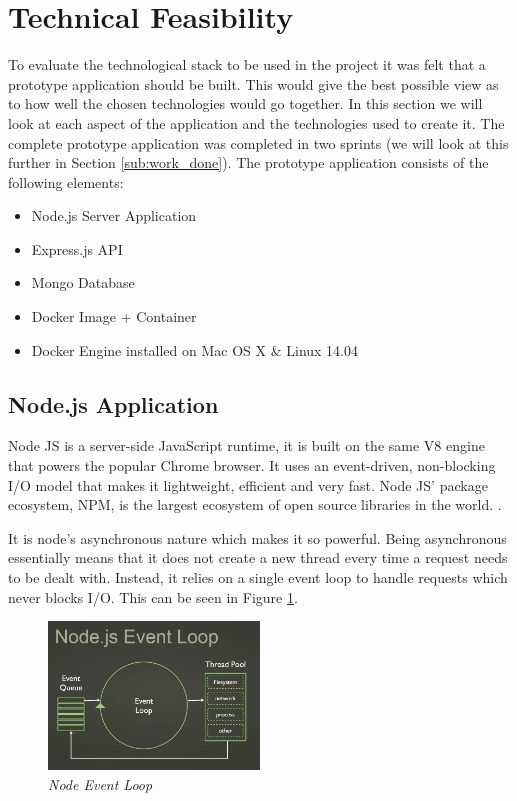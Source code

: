 \section{Technical Feasibility}
\label{sec:feasibility}
To evaluate the technological stack to be used in the project it was felt that a prototype application should be built. This would give the best possible view as to how well the chosen technologies would go together. In this section we will look at each aspect of the application and the technologies used to create it. The complete prototype application was completed in two sprints (we will look at this further in Section \ref{sub:work_done}). The prototype application consists of the following elements:

\begin{itemize}
  \item Node.js Server Application
  \item Express.js API
	\item Mongo Database
  \item Docker Image + Container
  \item Docker Engine installed on Mac OS X \& Linux 14.04 
\end{itemize}

\subsection{Node.js Application}
\label{sub:nodejs}
Node JS is a server-side JavaScript runtime, it is built on the same V8 engine that powers the popular Chrome browser. It uses an event-driven, non-blocking I/O model that makes it lightweight, efficient and very fast. Node JS' package ecosystem, NPM, is the largest ecosystem of open source libraries in the world. \citep{Nodejs.org2016}.

It is node's asynchronous nature which makes it so powerful. Being asynchronous essentially means that it does not create a new thread every time a request needs to be dealt with. Instead, it relies on a single event loop to handle requests which never blocks I/O. This can be seen in Figure \ref{fig:event_loop}.

\begin{figure}[!ht]
\centering
\includegraphics*[width=0.5\textwidth]{images/event_loop}
\caption{\em Node Event Loop}
\label{fig:event_loop}
\end{figure}

